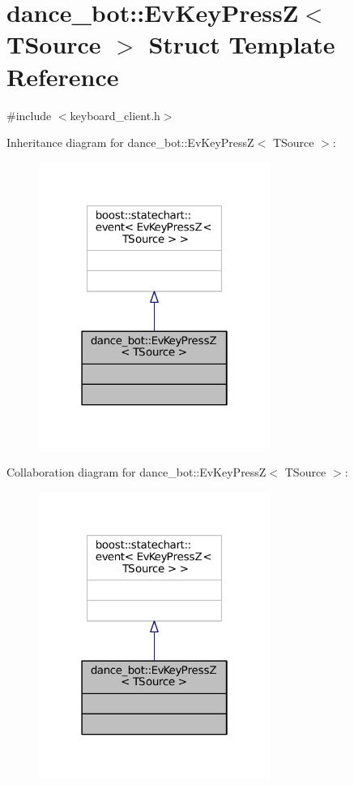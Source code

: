 \hypertarget{structdance__bot_1_1EvKeyPressZ}{}\section{dance\+\_\+bot\+:\+:Ev\+Key\+PressZ$<$ T\+Source $>$ Struct Template Reference}
\label{structdance__bot_1_1EvKeyPressZ}


{\ttfamily \#include $<$keyboard\+\_\+client.\+h$>$}



Inheritance diagram for dance\+\_\+bot\+:\+:Ev\+Key\+PressZ$<$ T\+Source $>$\+:
\nopagebreak
\begin{figure}[H]
\begin{center}
\leavevmode
\includegraphics[width=214pt]{structdance__bot_1_1EvKeyPressZ__inherit__graph}
\end{center}
\end{figure}


Collaboration diagram for dance\+\_\+bot\+:\+:Ev\+Key\+PressZ$<$ T\+Source $>$\+:
\nopagebreak
\begin{figure}[H]
\begin{center}
\leavevmode
\includegraphics[width=214pt]{structdance__bot_1_1EvKeyPressZ__coll__graph}
\end{center}
\end{figure}



